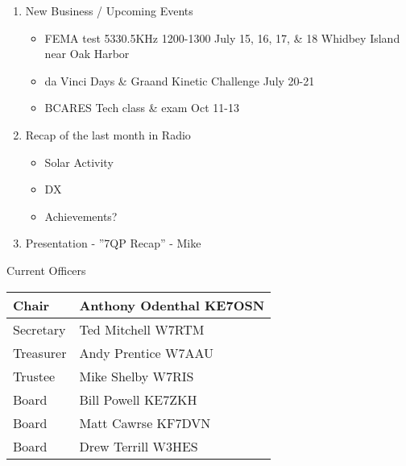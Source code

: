 \documentclass[letter,11pt]{extarticle}
\begin{document}
\begin{enumerate}
		\item  New Business / Upcoming Events
			\begin{itemize}
				\item FEMA test 5330.5KHz 1200-1300 July 15, 16, 17, \& 18 Whidbey Island near Oak Harbor
				\item da Vinci Days \& Graand Kinetic Challenge July 20-21
				\item BCARES Tech class \& exam Oct 11-13
			\end{itemize}
		\item Recap of the last month in Radio
			\begin{itemize}
				\item Solar Activity
				\item DX
				\item Achievements?
			\end{itemize}
		\item  Presentation - ''7QP Recap'' - Mike

	\end{enumerate}


	Current Officers \\
	\begin{tabular}{|l|l|} \hline
		Chair & Anthony Odenthal KE7OSN \\ \hline
		Secretary & Ted Mitchell W7RTM \\ \hline
		Treasurer & Andy Prentice W7AAU \\ \hline
		Trustee & Mike Shelby W7RIS   \\ \hline
		Board & Bill Powell KE7ZKH \\ \hline
		Board & Matt Cawrse KF7DVN \\ \hline
		Board & Drew Terrill W3HES\\ \hline
	\end{tabular}
	
	\subsection*{}
	
\end{document}
